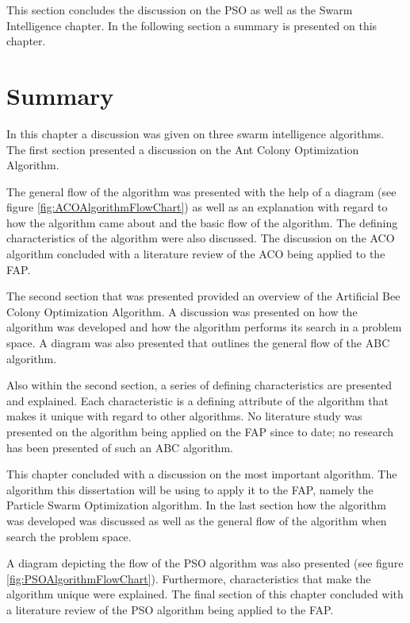 This section concludes the discussion on the PSO as well as the Swarm Intelligence chapter. In the following section a summary is presented on this chapter.
\section{Summary}
In this chapter a discussion was given on three swarm intelligence algorithms. The first section presented a discussion on the Ant Colony Optimization Algorithm.

The general flow of the algorithm was presented with the help of a diagram (see figure \ref{fig:ACOAlgorithmFlowChart}) as well as an explanation with regard to how the algorithm came about and the basic flow of the algorithm. The defining characteristics of the algorithm were also discussed. The discussion on the ACO algorithm concluded with a literature review of the ACO being applied to the FAP.

The second section that was presented provided an overview of the Artificial Bee Colony Optimization Algorithm. A discussion was presented on how the algorithm was developed and how the algorithm performs its search in a problem space. A diagram was also presented that outlines the general flow of the ABC algorithm.

Also within the second section, a series of defining characteristics are presented and explained. Each characteristic is a defining attribute of the algorithm that makes it unique with regard to other algorithms. No literature study was presented on the algorithm being applied on the FAP since to date; no research has been presented of such an ABC algorithm.

This chapter concluded with a discussion on the most important algorithm. The algorithm this dissertation will be using to apply it to the FAP, namely the Particle Swarm Optimization algorithm. In the last section how the algorithm was developed was discussed as well as the general flow of the algorithm when search the problem space.

A diagram depicting the flow of the PSO algorithm was also presented (see figure \ref{fig:PSOAlgorithmFlowChart}). Furthermore, characteristics that make the algorithm unique were explained. The final section of this chapter concluded with a literature review of the PSO algorithm being applied to the FAP.
